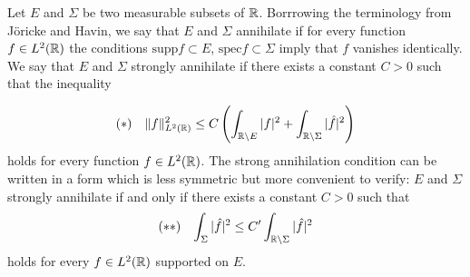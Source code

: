 Let $E$ and $\Sigma$ be two measurable subsets of $\mathbb{R}$. Borrrowing the terminology from J\"{o}ricke and Havin, we say that $E$ and $\Sigma$ annihilate if for every  function $f\in L^2(\mathbb{R})$ the conditions $\mathrm{supp}f\subset E$, $\mathrm{spec}f\subset \Sigma$ imply that $f$ vanishes identically. We say that $E$ and $\Sigma$ strongly annihilate if there exists a constant $C>0$ such that the inequality

\begin{equation*}
  \begin{aligned}
    (*)  & &  \|f\|^2_{L^2(\mathbb{R})}\le C\left( \int_{\mathbb{R}\backslash E}|f|^2+\int_{\mathbb{R}\backslash \Sigma}|\hat{f}|^2 \right) 
  \end{aligned}
\end{equation*}
holds for every function $f\in L^2(\mathbb{R})$. The strong annihilation condition can be written in a form which is less symmetric but more convenient to verify: $E$ and $\Sigma$ strongly annihilate if and only if there exists a constant $C>0$ such that 
  \begin{equation*}
    \begin{aligned}
      (**) & & \int_{\Sigma}|\hat{f}|^2\le C'\int_{\mathbb{R}\backslash \Sigma}|\hat{f}|^2
    \end{aligned}
  \end{equation*}
  holds for every $f\in L^2(\mathbb{R})$ supported on $E$.

